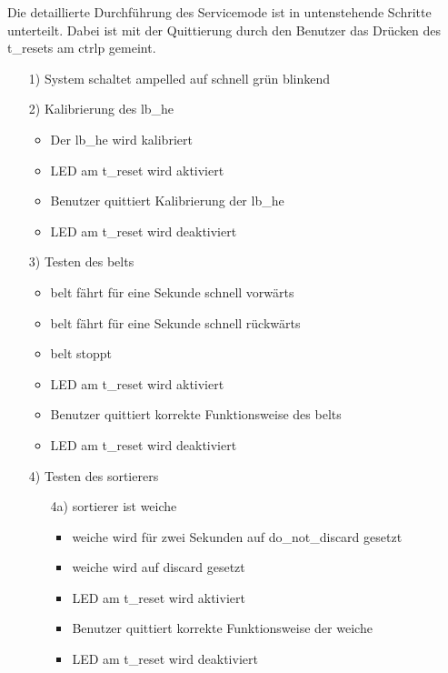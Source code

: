Die detaillierte Durchführung des Servicemode ist in untenstehende Schritte unterteilt. Dabei ist mit der Quittierung
durch den Benutzer das Drücken des \gls{t_reset}s am \gls{ctrlp} gemeint.
\begin{enumerate}

    \item[1)] System schaltet \gls{ampelled} auf schnell grün blinkend
    \item[2)] Kalibrierung des \gls{lb_he}
    \begin{itemize}
        \item Der \gls{lb_he} wird kalibriert
        \item LED am \gls{t_reset} wird aktiviert
        \item Benutzer quittiert Kalibrierung der \gls{lb_he}
        \item LED am \gls{t_reset} wird deaktiviert
    \end{itemize}
    \item[3)] Testen des \gls{belt}s
    \begin{itemize}
        \item \Gls{belt} fährt für eine Sekunde schnell vorwärts
        \item \Gls{belt} fährt für eine Sekunde schnell rückwärts
        \item \Gls{belt} stoppt
        \item LED am \gls{t_reset} wird aktiviert
        \item Benutzer quittiert korrekte Funktionsweise des \gls{belt}s
        \item LED am \gls{t_reset} wird deaktiviert
    \end{itemize}
    \item[4)] Testen des \gls{sortierer}s
    \begin{enumerate}
        \item[4a)] \Gls{sortierer} ist \gls{weiche}
        \begin{itemize}
            \item \gls{weiche} wird für zwei Sekunden auf \gls{do_not_discard} gesetzt
            \item \gls{weiche} wird auf \gls{discard} gesetzt
            \item LED am \gls{t_reset} wird aktiviert
            \item Benutzer quittiert korrekte Funktionsweise der \gls{weiche}
            \item LED am \gls{t_reset} wird deaktiviert
        \end{itemize}

\end{enumerate}
\end{enumerate}
